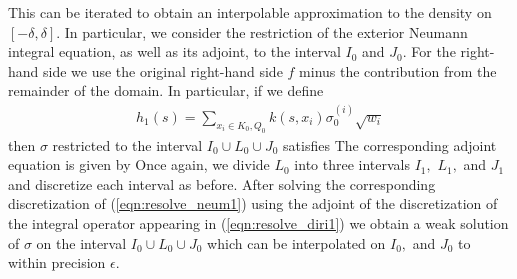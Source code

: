 
This can be iterated to obtain an interpolable approximation to the density on $[-\delta,\delta].$ In particular, we consider the restriction of the exterior Neumann integral equation, as well as its adjoint, to the interval $I_0$ and $J_0.$ For the right-hand side we use the original right-hand side $f$ minus the contribution from the remainder of the domain. In particular, if we define
\begin{align}
h_1(s) = \sum_{x_i \in K_0,Q_0} k(s,x_i) \sigma_0^{(i)} \sqrt{w_i}
\end{align}
then $\sigma$ restricted to the interval $I_0\cup L_0 \cup J_0$ satisfies
The corresponding adjoint equation is given by 
Once again, we divide $L_0$ into three intervals $I_1,$ $L_1,$ and $J_1$ and discretize each interval as before. After solving the corresponding discretization of (\ref{eqn:resolve_neum1}) using the adjoint of the discretization of the integral operator appearing in (\ref{eqn:resolve_diri1}) we obtain a weak solution of $\sigma$ on the interval $I_0\cup L_0 \cup J_0$ which can be interpolated on $I_0,$ and $J_0$ to within precision $\epsilon.$

